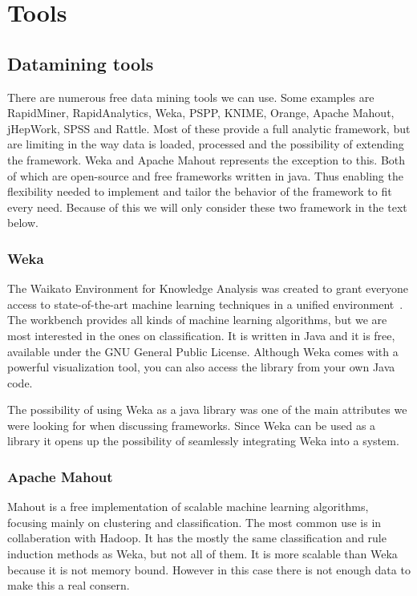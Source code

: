 \section{Tools}

\subsection{Datamining tools}
There are numerous free data mining tools we can use. Some examples are RapidMiner, RapidAnalytics, Weka, PSPP, KNIME, Orange, Apache Mahout, jHepWork, SPSS and Rattle.
Most of these provide a full analytic framework, but are limiting in the way data is loaded, processed and the possibility of extending the framework. 
Weka and Apache Mahout represents the exception to this. Both of which are open-source and free frameworks written in java. 
Thus enabling the flexibility needed to implement and tailor the behavior of the framework to fit every need.
Because of this we will only consider these two framework in the text below.

\subsubsection{Weka}
The Waikato Environment for Knowledge Analysis was created to grant everyone access to state-of-the-art machine learning techniques in a unified environment~\cite{Hall:2009:WDM:1656274.1656278}. 
The workbench provides all kinds of machine learning algorithms, but we are most interested in the ones on classification. 
It is written in Java and it is free, available under the GNU General Public License. 
Although Weka comes with a powerful visualization tool, you can also access the library from your own Java code.

\bigskip\noindent
The possibility of using Weka as a java library was one of the main attributes we were looking for when discussing frameworks.
Since Weka can be used as a library it opens up the possibility of seamlessly integrating Weka into a system.

\subsubsection{Apache Mahout}
Mahout is a free implementation of scalable machine learning algorithms, focusing mainly on clustering and classification.
The most common use is in collaberation with Hadoop.
It has the mostly the same classification and rule induction methods as Weka, but not all of them. 
It is more scalable than Weka because it is not memory bound. 
However in this case there is not enough data to make this a real consern. 

